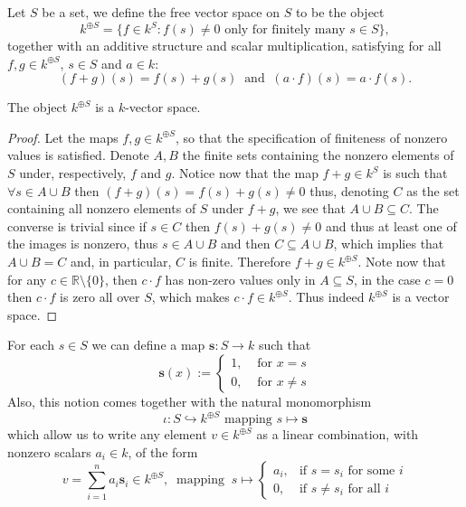 \begin{definition}\label{def: free vector space}
   Let \(S\) be a set, we define the free vector space on \(S\) to be the object
   \[
      k^{\oplus S} = \{f \in k^S : f(s) \neq 0 \text{ only for finitely many }
      s \in S\},
   \]
   together with an additive structure and scalar multiplication, satisfying for
   all \(f, g \in k^{\oplus S}\), \(s \in S\) and \(a \in k\):
   \[
      (f + g)(s) = f(s) + g(s)\ \text{ and }\ (a \cdot f)(s) = a \cdot f(s).
   \]
\end{definition}

\begin{proposition}
   The object \(k^{\oplus S}\) is a \(k\)-vector space.
\end{proposition}

\begin{proof}
   Let the maps \(f, g \in k^{\oplus S}\), so that the specification of
   finiteness of nonzero values is satisfied. Denote \(A, B\) the finite sets
   containing the nonzero elements of \(S\) under, respectively, \(f\) and
   \(g\). Notice now that the map \(f + g \in k^S\) is such that \(\forall s \in
   A \cup B\) then \((f+g)(s) = f(s)+g(s) \neq  0\) thus, denoting \(C\) as the
   set containing all nonzero elements of \(S\) under \(f + g\), we see that \(A
   \cup B \subseteq C\). The converse is trivial since if \(s \in C\) then
   \(f(s) + g(s) \neq 0\) and thus at least one of the images is nonzero, thus
   \(s \in A \cup B\) and then \(C \subseteq  A \cup B\), which implies that \(A
   \cup B = C\) and, in particular, \(C\) is finite. Therefore \(f + g \in
   k^{\oplus S}\). Note now that for any \(c \in \mathbb{R} \setminus \{0\}\),
   then \(c \cdot f\) has non-zero values only in \(A \subseteq S\), in the case
   \(c = 0\) then  \(c \cdot f\) is zero all over \(S\), which makes \(c \cdot f
   \in k^{\oplus S}\). Thus indeed \(k^{\oplus S}\) is a vector space.
\end{proof}

For each \(s \in S\) we can define a map \(\mathbf{s} : S \to k\) such that
\[
   \mathbf{s}(x) :=
   \begin{cases}
      1, &\text{ for } x = s\\
      0, &\text{ for } x \neq s
   \end{cases}
\]
Also, this notion comes together with the natural monomorphism
\[
   \iota : S \hookrightarrow k^{\oplus S} \text{ mapping } s \mapsto \mathbf{s}
\]
which allow us to write any element \(v \in k^{\oplus S}\) as a linear
combination, with nonzero scalars \(a_i \in k\), of the form
\[
   v = \sum_{i=1}^n a_i \mathbf{s}_i \in k^{\oplus S},\
   \text{ mapping }\ s \mapsto
   \begin{cases}
      a_i, &\text{if } s = s_i \text{ for some } i \\
      0, &\text{if } s \neq s_i \text{ for all } i
   \end{cases}
\]

